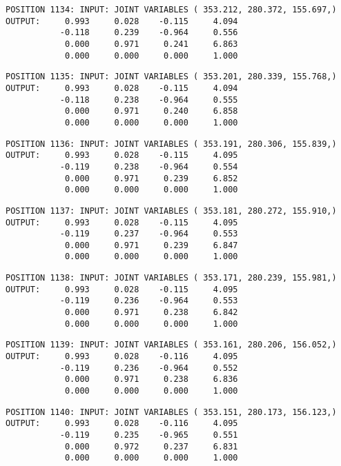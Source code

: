 \begin{verbatim}
POSITION 1134: INPUT: JOINT VARIABLES ( 353.212, 280.372, 155.697,)
OUTPUT:     0.993     0.028    -0.115     4.094
           -0.118     0.239    -0.964     0.556
            0.000     0.971     0.241     6.863
            0.000     0.000     0.000     1.000
\end{verbatim} \pagebreak[1]\begin{verbatim}
POSITION 1135: INPUT: JOINT VARIABLES ( 353.201, 280.339, 155.768,)
OUTPUT:     0.993     0.028    -0.115     4.094
           -0.118     0.238    -0.964     0.555
            0.000     0.971     0.240     6.858
            0.000     0.000     0.000     1.000
\end{verbatim} \pagebreak[1]\begin{verbatim}
POSITION 1136: INPUT: JOINT VARIABLES ( 353.191, 280.306, 155.839,)
OUTPUT:     0.993     0.028    -0.115     4.095
           -0.119     0.238    -0.964     0.554
            0.000     0.971     0.239     6.852
            0.000     0.000     0.000     1.000
\end{verbatim} \pagebreak[1]\begin{verbatim}
POSITION 1137: INPUT: JOINT VARIABLES ( 353.181, 280.272, 155.910,)
OUTPUT:     0.993     0.028    -0.115     4.095
           -0.119     0.237    -0.964     0.553
            0.000     0.971     0.239     6.847
            0.000     0.000     0.000     1.000
\end{verbatim} \pagebreak[1]\begin{verbatim}
POSITION 1138: INPUT: JOINT VARIABLES ( 353.171, 280.239, 155.981,)
OUTPUT:     0.993     0.028    -0.115     4.095
           -0.119     0.236    -0.964     0.553
            0.000     0.971     0.238     6.842
            0.000     0.000     0.000     1.000
\end{verbatim} \pagebreak[1]\begin{verbatim}
POSITION 1139: INPUT: JOINT VARIABLES ( 353.161, 280.206, 156.052,)
OUTPUT:     0.993     0.028    -0.116     4.095
           -0.119     0.236    -0.964     0.552
            0.000     0.971     0.238     6.836
            0.000     0.000     0.000     1.000
\end{verbatim} \pagebreak[1]\begin{verbatim}
POSITION 1140: INPUT: JOINT VARIABLES ( 353.151, 280.173, 156.123,)
OUTPUT:     0.993     0.028    -0.116     4.095
           -0.119     0.235    -0.965     0.551
            0.000     0.972     0.237     6.831
            0.000     0.000     0.000     1.000
\end{verbatim} \pagebreak[1]\begin{verbatim}

\end{verbatim}
